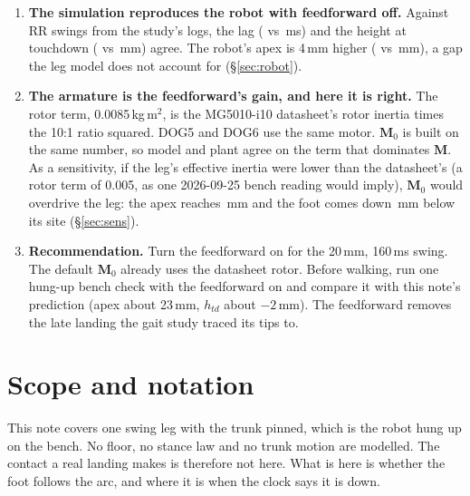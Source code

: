 \documentclass[11pt,a4paper]{article}
\newcommand{\Mmat}{\mathbf{M}}
\begin{document}
\begin{enumerate}[leftmargin=1.5em]
\item \textbf{The simulation reproduces the robot with feedforward off.} Against
\RobN{} RR swings from the study's logs, the lag (\RobLag{} vs \LagOff\,ms) and
the height at touchdown (\RobHtd{} vs \HtdOff\,mm) agree. The robot's apex is
4\,mm higher (\RobApex{} vs \ApexOff\,mm), a gap the leg model does not
account for (\S\ref{sec:robot}).

\item \textbf{The armature is the feedforward's gain, and here it is right.}
The rotor term, 0.0085\,kg\,m$^2$, is the MG5010-i10 datasheet's rotor inertia
times the 10:1 ratio squared. DOG5 and DOG6 use the same motor. $\Mmat_0$ is
built on the same number, so model and plant agree on the term that dominates
$\Mmat$. As a sensitivity, if the leg's effective inertia were lower than the
datasheet's (a rotor term of 0.005, as one 2026-09-25 bench reading would
imply), $\Mmat_0$ would overdrive the leg: the apex reaches \ApexArmOn\,mm and
the foot comes down \UnderArmOnAbs\,mm below its site (\S\ref{sec:sens}).

\item \textbf{Recommendation.} Turn the feedforward on for the 20\,mm, 160\,ms
swing. The default $\Mmat_0$ already uses the datasheet rotor. Before walking,
run one hung-up bench check with the feedforward on and compare it with this
note's prediction (apex about 23\,mm, $h_{td}$ about $-2$\,mm). The feedforward
removes the late landing the gait study traced its tips to.
\end{enumerate}

\section{Scope and notation}

This note covers one swing leg with the trunk pinned, which is the robot hung up
on the bench. No floor, no stance law and no trunk motion are modelled. The
contact a real landing makes is therefore not here. What is here is whether the
foot follows the arc, and where it is when the clock says it is down.
\end{document}
